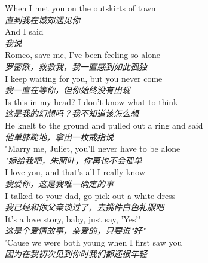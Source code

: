 \begin{spacing}{1.5}
\begin{flushleft}
When I met you on the outskirts of town\\
\textit{直到我在城郊遇见你}\\[0.5em]

And I said\\
\textit{我说}\\[0.5em]

Romeo, save me, I've been feeling so alone\\
\textit{罗密欧，救救我，我一直感到如此孤独}\\[0.5em]

I keep waiting for you, but you never come\\
\textit{我一直在等你，但你始终没有出现}\\[0.5em]

Is this in my head? I don't know what to think\\
\textit{这是我的幻想吗？我不知道该怎么想}\\[0.5em]

He knelt to the ground and pulled out a ring and said\\
\textit{他单膝跪地，拿出一枚戒指说}\\[0.5em]

"Marry me, Juliet, you'll never have to be alone\\
\textit{"嫁给我吧，朱丽叶，你再也不会孤单}\\[0.5em]

I love you, and that's all I really know\\
\textit{我爱你，这是我唯一确定的事}\\[0.5em]

I talked to your dad, go pick out a white dress\\
\textit{我已经和你父亲谈过了，去挑件白色礼服吧}\\[0.5em]

It's a love story, baby, just say, 'Yes'"\\
\textit{这是个爱情故事，亲爱的，只要说"好"}\\[0.5em]

'Cause we were both young when I first saw you\\
\textit{因为在我初次见到你时我们都还很年轻}\\[0.5em]
\end{flushleft}
\end{spacing} 
